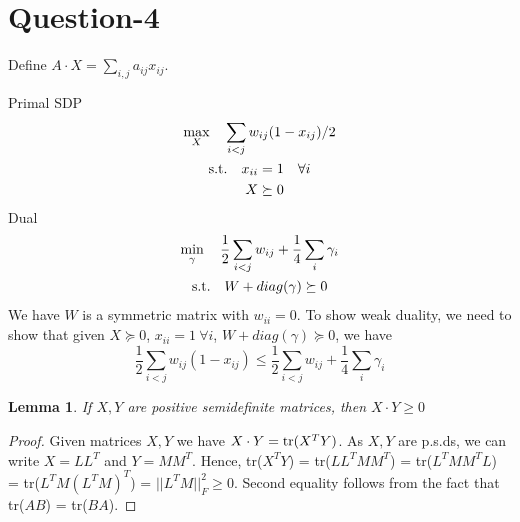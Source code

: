\documentclass{article}
\newtheorem{lemma}[theorem]{Lemma}
\begin{document}
\section*{Question-4}

Define $A \cdot X = \sum_{i,j}a_{ij}x_{ij}$.

\noindent
Primal SDP
\begin{gather*}
    \max_{X} \quad \sum_{i < j}w_{ij}(1-x_{ij})/2 \\
    \begin{aligned}
    \textup{s.t.}\quad x_{ii} &= 1 \quad \forall i\\
    X &\succeq 0
    \end{aligned}
\end{gather*}
Dual
\begin{gather*}
    \min_{\gamma} \quad \frac{1}{2}\sum_{i < j}w_{ij} + \frac{1}{4}\sum_{i}\gamma_i\\
    \begin{aligned}
    \textup{s.t.}\quad W + diag(\gamma) \succeq 0\\
    \end{aligned}
\end{gather*}
We have $W$ is a symmetric matrix with $w_{ii} = 0$. To show weak duality, we need to show that given $X \succeq 0$, $x_{ii} = 1\ \forall i$, $W + diag(\gamma) \succeq 0$, we have
\begin{equation*}
    \frac{1}{2}\sum_{i < j}w_{ij}(1-x_{ij}) \leq \frac{1}{2}\sum_{i < j}w_{ij} + \frac{1}{4}\sum_{i}\gamma_i
\end{equation*}
\begin{lemma}
    If $X,Y$ are positive semidefinite matrices, then $X \cdot Y \ge 0$
\end{lemma}
\begin{proof}
    Given matrices $X,Y$ we have $X \cdot Y = \textup{tr}(X^TY)$. As $X,Y$ are p.s.ds, we can write $X = LL^T$ and $Y = MM^T$. Hence, tr($X^TY$) = tr($LL^TMM^T$) = tr($L^TMM^TL$) = tr($L^TM(L^TM)^T$) = $||L^TM||_{F}^2 \ge 0$. Second equality follows from the fact that tr($AB$) = tr($BA$).
\end{proof}
\end{document}
